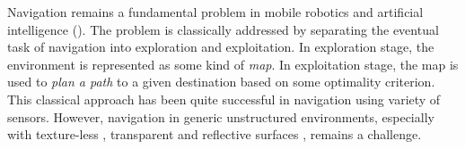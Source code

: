 
Navigation remains a fundamental problem in mobile robotics and artificial intelligence (\cite{SmChIJRR1986,ElCOMPUTER1980}).
The problem is classically addressed by separating the eventual task of navigation into exploration and exploitation. 
In exploration stage, the environment is represented as some kind of \emph{map}. 
In exploitation stage, the map is used to \emph{plan a path} to a given destination based on some optimality criterion. 
This classical approach has been quite successful in navigation using variety of sensors. However, navigation in generic unstructured environments, especially with texture-less \cite{YaSoKaIROS2016}, transparent and reflective surfaces \cite{lai2011large}, remains a challenge.


